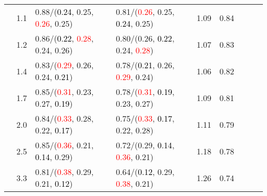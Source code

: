 \documentclass[10pt,a4paper]{report}
\begin{document}
\begin{table}[!htbp]
\begin{center}
{\begin{tabular}{ccllccccc}
				  & 1.1                               & 0.88/(\textcolor{black}{0.24}, 0.25, \textcolor{red}{0.26}, 0.25)                                                                               & 0.81/(\textcolor{red}{0.26}, 0.25, \textcolor{black}{0.24}, 0.25)                                                                               & 1.09             & 0.84                     \\
				  & 1.2                               & 0.86/(\textcolor{black}{0.22}, \textcolor{red}{0.28}, 0.24, 0.26)                                                                               & 0.80/(0.26, \textcolor{black}{0.22}, 0.24, \textcolor{red}{0.28})                                                                               & 1.07             & 0.83                     \\
				  & 1.4                               & 0.83/(\textcolor{red}{0.29}, 0.26, 0.24, \textcolor{black}{0.21})                                                                               & 0.78/(\textcolor{black}{0.21}, 0.26, \textcolor{red}{0.29}, 0.24)                                                                               & 1.06             & 0.82                     \\
				  & 1.7                               & 0.85/(\textcolor{red}{0.31}, 0.23, 0.27, \textcolor{black}{0.19})                                                                               & 0.78/(\textcolor{red}{0.31}, \textcolor{black}{0.19}, 0.23, 0.27)                                                                               & 1.09             & 0.81                     \\
				  & 2.0                               & 0.84/(\textcolor{red}{0.33}, 0.28, 0.22, \textcolor{black}{0.17})                                                                               & 0.75/(\textcolor{red}{0.33}, \textcolor{black}{0.17}, 0.22, 0.28)                                                                               & 1.11             & 0.79                     \\
				  & 2.5                               & 0.85/(\textcolor{red}{0.36}, 0.21, \textcolor{black}{0.14}, 0.29)                                                                               & 0.72/(0.29, \textcolor{black}{0.14}, \textcolor{red}{0.36}, 0.21)                                                                               & 1.18             & 0.78                     \\
				  & 3.3                               & 0.81/(\textcolor{red}{0.38}, 0.29, 0.21, \textcolor{black}{0.12})                                                                               & 0.64/(\textcolor{black}{0.12}, 0.29, \textcolor{red}{0.38}, 0.21)                                                                               & 1.26             & 0.74                     \\

\end{tabular}}
\end{center}
\end{table}
\end{document}
